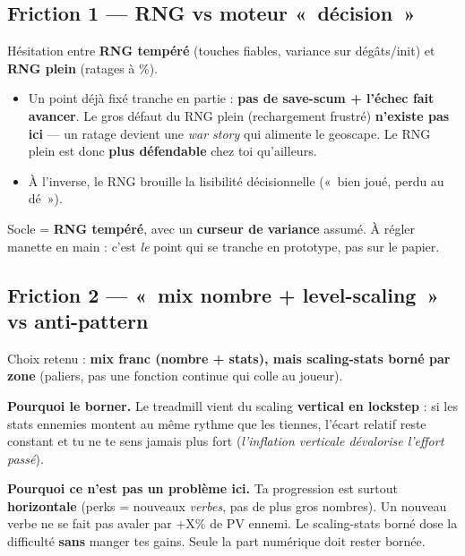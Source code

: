 \documentclass[11pt,a4paper]{article}
\begin{document}
\subsection{Friction 1 --- RNG vs moteur «~décision~»}
Hésitation entre \textbf{RNG tempéré} (touches fiables, variance sur dégâts/init) et \textbf{RNG plein} (ratages à \%).
\begin{itemize}
\item Un point déjà fixé tranche en partie : \textbf{pas de save-scum + l'échec fait avancer}. Le gros défaut du RNG plein (rechargement frustré) \textbf{n'existe pas ici} --- un ratage devient une \emph{war story} qui alimente le geoscape. Le RNG plein est donc \textbf{plus défendable} chez toi qu'ailleurs.
\item À l'inverse, le RNG brouille la lisibilité décisionnelle («~bien joué, perdu au dé~»).
\end{itemize}
\begin{ouvert}
Socle = \textbf{RNG tempéré}, avec un \textbf{curseur de variance} assumé. À régler manette en main : c'est \emph{le} point qui se tranche en prototype, pas sur le papier.
\end{ouvert}

\subsection{Friction 2 --- «~mix nombre + level-scaling~» vs anti-pattern}
Choix retenu : \textbf{mix franc (nombre + stats), mais scaling-stats borné par zone} (paliers, pas une fonction continue qui colle au joueur).
\begin{antipat}
\textbf{Pourquoi le borner.} Le treadmill vient du scaling \textbf{vertical en lockstep} : si les stats ennemies montent au même rythme que les tiennes, l'écart relatif reste constant et tu ne te sens jamais plus fort (\emph{l'inflation verticale dévalorise l'effort passé}).

\smallskip
\textbf{Pourquoi ce n'est pas un problème ici.} Ta progression est surtout \textbf{horizontale} (perks = nouveaux \emph{verbes}, pas de plus gros nombres). Un nouveau verbe ne se fait pas avaler par +X\% de PV ennemi. Le scaling-stats borné dose la difficulté \textbf{sans} manger tes gains. Seule la part numérique doit rester bornée.
\end{antipat}

\end{document}
